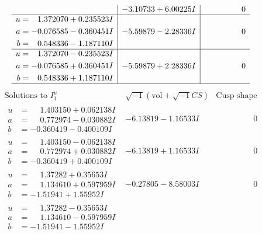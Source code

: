 \documentclass[1p]{elsarticle_modified}
\theoremstyle{definition}
\newcommand{\I}{\sqrt{-1}}
\begin{document}
$$\begin{array}{c|c|c}
 & -3.10733 + 6.00225 I & \phantom{-0.000000 } 0 \\ \hline\begin{aligned}
u &= \phantom{-}1.372070 + 0.235523 I \\
a &= -0.076585 - 0.360451 I \\
b &= \phantom{-}0.548336 - 1.187110 I\end{aligned}
 & -5.59879 - 2.28336 I & \phantom{-0.000000 } 0 \\ \hline\begin{aligned}
u &= \phantom{-}1.372070 - 0.235523 I \\
a &= -0.076585 + 0.360451 I \\
b &= \phantom{-}0.548336 + 1.187110 I\end{aligned}
 & -5.59879 + 2.28336 I & \phantom{-0.000000 } 0\\
 \hline 
 \end{array}$$\newpage$$\begin{array}{c|c|c}  
\text{Solutions to }I^u_{1}& \I (\text{vol} + \sqrt{-1}CS) & \text{Cusp shape}\\
 \hline 
\begin{aligned}
u &= \phantom{-}1.403150 + 0.062138 I \\
a &= \phantom{-}0.772974 - 0.030882 I \\
b &= -0.360419 - 0.400109 I\end{aligned}
 & -6.13819 - 1.16533 I & \phantom{-0.000000 } 0 \\ \hline\begin{aligned}
u &= \phantom{-}1.403150 - 0.062138 I \\
a &= \phantom{-}0.772974 + 0.030882 I \\
b &= -0.360419 + 0.400109 I\end{aligned}
 & -6.13819 + 1.16533 I & \phantom{-0.000000 } 0 \\ \hline\begin{aligned}
u &= \phantom{-}1.37282 + 0.35653 I \\
a &= \phantom{-}1.134610 + 0.597959 I \\
b &= -1.51941 + 1.55952 I\end{aligned}
 & -0.27805 - 8.58003 I & \phantom{-0.000000 } 0 \\ \hline\begin{aligned}
u &= \phantom{-}1.37282 - 0.35653 I \\
a &= \phantom{-}1.134610 - 0.597959 I \\
b &= -1.51941 - 1.55952 I\end{aligned}

\end{array}$$
\end{document}
